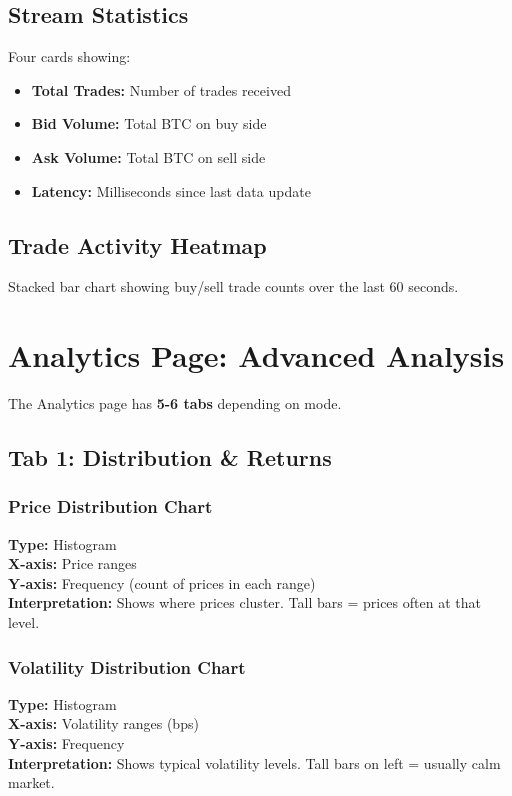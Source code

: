 \documentclass[12pt,a4paper]{article}
\begin{document}
\subsection{Stream Statistics}
Four cards showing:
\begin{itemize}
    \item \textbf{Total Trades:} Number of trades received
    \item \textbf{Bid Volume:} Total BTC on buy side
    \item \textbf{Ask Volume:} Total BTC on sell side
    \item \textbf{Latency:} Milliseconds since last data update
\end{itemize}

\subsection{Trade Activity Heatmap}
Stacked bar chart showing buy/sell trade counts over the last 60 seconds.

\section{Analytics Page: Advanced Analysis}

The Analytics page has \textbf{5-6 tabs} depending on mode.

\subsection{Tab 1: Distribution \& Returns}

\subsubsection{Price Distribution Chart}
\textbf{Type:} Histogram\\
\textbf{X-axis:} Price ranges\\
\textbf{Y-axis:} Frequency (count of prices in each range)\\
\textbf{Interpretation:} Shows where prices cluster. Tall bars = prices often at that level.

\subsubsection{Volatility Distribution Chart}
\textbf{Type:} Histogram\\
\textbf{X-axis:} Volatility ranges (bps)\\
\textbf{Y-axis:} Frequency\\
\textbf{Interpretation:} Shows typical volatility levels. Tall bars on left = usually calm market.
\end{document}
